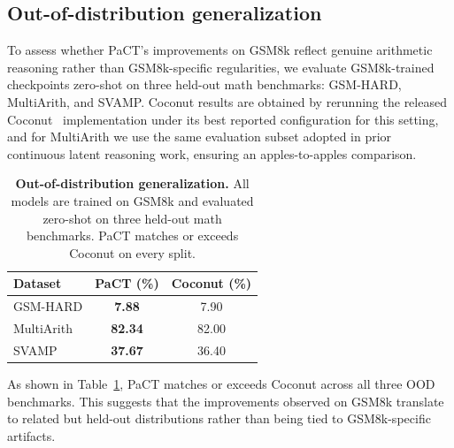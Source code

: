 \subsection{Out-of-distribution generalization}
\label{sec:ood_transfer}

To assess whether PaCT's improvements on GSM8k reflect genuine arithmetic reasoning rather than
GSM8k-specific regularities, we evaluate GSM8k-trained checkpoints zero-shot on three held-out math
benchmarks: GSM-HARD, MultiArith, and SVAMP. Coconut results are obtained by rerunning the released
Coconut~\cite{hao2024training} implementation under its best reported configuration for this
setting, and for MultiArith we use the same evaluation subset adopted in prior continuous latent
reasoning work, ensuring an apples-to-apples comparison.

\begin{table}[t]
\centering
\small
\caption{\textbf{Out-of-distribution generalization.}
All models are trained on GSM8k and evaluated zero-shot on three held-out math benchmarks. PaCT
matches or exceeds Coconut on every split.}
\label{tab:ood_transfer}
\begin{tabular}{lcc}
\toprule
Dataset & PaCT (\%) & Coconut (\%) \\
\midrule
GSM-HARD                  & \textbf{7.88}  & 7.90  \\
MultiArith                & \textbf{82.34} & 82.00 \\
SVAMP                     & \textbf{37.67} & 36.40 \\
\bottomrule
\end{tabular}
\end{table}

As shown in Table~\ref{tab:ood_transfer}, PaCT matches or exceeds Coconut across all three OOD
benchmarks. This suggests that the improvements observed on GSM8k translate to related but held-out
distributions rather than being tied to GSM8k-specific artifacts.




